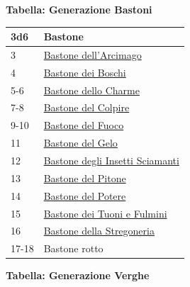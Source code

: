 \begin{multicols}{2}
{\medskip

\textbf{Tabella: Generazione Bastoni}\hypertarget{Bastoni}{}

\medskip

{\small\begin{tabularx}{\linewidth}{ll}
		\toprule
\rowcolor{gray!20}\textbf{3d6} & \textbf{Bastone}\\
\toprule
3 & \hyperlink{Bastone dell'Arcimago}{Bastone dell'Arcimago}\\
\rowcolor{gray!20}4 & \hyperlink{Bastone dei Boschi}{Bastone dei Boschi}\\
5-6 & \hyperlink{Bastone dello Charme}{Bastone dello Charme}\\
\rowcolor{gray!20}7-8 & \hyperlink{Bastone del Colpire}{Bastone del Colpire}\\
9-10 & \hyperlink{Bastone del Fuoco}{Bastone del Fuoco}\\
\rowcolor{gray!20}11 & \hyperlink{Bastone del Gelo}{Bastone del Gelo}\\
12 & \hyperlink{Bastoned egli Insetti Sciamanti}{Bastone degli Insetti Sciamanti}\\
\rowcolor{gray!20}13 & \hyperlink{Bastone del Pitone}{Bastone del Pitone}\\
14 & \hyperlink{Bastone del Potere}{Bastone del Potere}\\
\rowcolor{gray!20}15 & \hyperlink{Bastone dei Tuoni e Fulmini}{Bastone dei Tuoni e Fulmini}\\
16 & \hyperlink{Bastone della Stregoneria}{Bastone della Stregoneria}\\
\rowcolor{gray!20}17-18 & Bastone rotto\\
\end{tabularx}}

\medskip

\textbf{Tabella: Generazione Verghe}\hypertarget{Verghe}{}

\medskip

}
\end{multicols}
